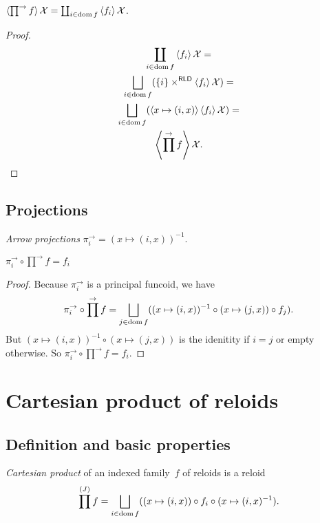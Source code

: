 \begin{prop}
$\left\langle \prod^{\rightarrow}f\right\rangle\mathcal{X}=\coprod_{i\in\operatorname{dom} f}\left\langle f_i\right\rangle\mathcal{X}$.
\end{prop}

\begin{proof}
\begin{multline*}
\coprod_{i\in\dom f}\supfun{f_i}\mathcal{X}=\\
\bigsqcup_{i\in\dom f}(\{i\}\times^{\mathsf{RLD}}\supfun{f_i}\mathcal{X})=\\
\bigsqcup_{i\in\dom f}(\supfun{x\mapsto(i,x)}\supfun{f_i}\mathcal{X})=\\
\supfun{\prod^{\rightarrow}f}\mathcal{X}.
\end{multline*}
\end{proof}

\subsection{Projections}

\begin{defn}
\emph{Arrow projections}
$\pi^{\rightarrow}_i = (x\mapsto(i,x))^{-1}$.
\end{defn}

\begin{thm}
$\pi^{\rightarrow}_i\circ\prod^{\rightarrow}f=f_i$
\end{thm}

\begin{proof}
Because $\pi^{\rightarrow}_i$ is a principal funcoid, we have
\[ \pi^{\rightarrow}_i\circ\prod^{\rightarrow}f=
\bigsqcup_{j\in\dom f}((x\mapsto(i,x))^{-1}\circ(x\mapsto(j,x))\circ f_j). \]
But $(x\mapsto(i,x))^{-1}\circ(x\mapsto(j,x))$ is the idenitity if $i=j$ or
empty otherwise. So
$\pi^{\rightarrow}_i\circ\prod^{\rightarrow}f=f_i$.
\end{proof}

\section{Cartesian product of reloids}

\subsection{Definition and basic properties}

\begin{defn}
\emph{Cartesian product} of an indexed family~$f$ of reloids is
a reloid \[ \prod^{(J)} f=\bigsqcup_{i\in\dom f}((x\mapsto(i,x))\circ f_i\circ(x\mapsto(i,x)^{-1}). \]
\end{defn}

